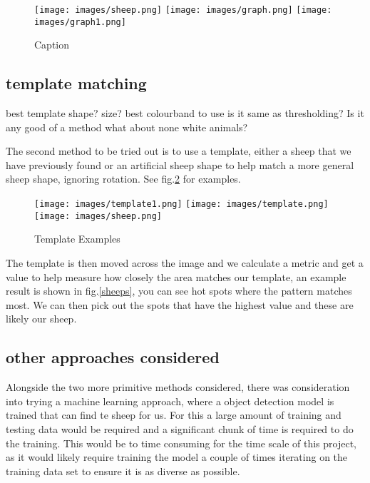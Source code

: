 \begin{figure}
    \centering
    \texttt{[image: images/sheep.png]}
    \texttt{[image: images/graph.png]}
    \texttt{[image: images/graph1.png]}
    \caption{Caption}
    \label{fig:my_label}
\end{figure}
    
    

\subsection{template matching}

best template shape? size? best colourband to use is it same as thresholding? Is it any good of a method what about none white animals?


The second method to be tried out is to use a template, either a sheep that we have previously found or an artificial sheep shape to help match a more general sheep shape, ignoring rotation. See fig.\ref{templates} for examples.
    
    \begin{figure}
        \caption{Template Examples}
        \texttt{[image: images/template1.png]}
        \texttt{[image: images/template.png]}
        \texttt{[image: images/sheep.png]}
        \label{templates}
    \end{figure}
    
    The template is then moved across the image and we calculate a metric and get a value to help measure how closely the area matches our template, an example result is shown in fig.\ref{sheeps}, you can see hot spots where the pattern matches most. We can then pick out the spots that have the highest value and these are likely our sheep.

\subsection{other approaches considered}

Alongside the two more primitive methods considered, there was consideration into trying a machine learning approach, where a object detection model is trained that can find te sheep for us. 
For this a large amount of training and testing data would be required and a significant chunk of time is required to do the training. 
This would be to time consuming for the time scale of this project, as it would likely require training the model a couple of times iterating on the training data set to ensure it is as diverse as possible.

